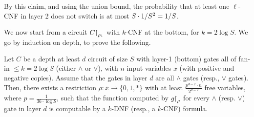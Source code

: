 By this claim, and using the union bound, the probability that at least one $\ell$-CNF in layer 2 does not switch is at most $ S\cdot 1/S^2 = 1/S$.



We now start from a circuit $C{\upharpoonright}_{\rho_1}$ with $k$-CNF at the bottom, for $k = 2 \log S$.
We go by induction on depth, to prove the following.


\begin{tcolorbox}[colframe=white, colback=red!11, boxrule=0mm, sharp corners]
\begin{lemma}\label{lem:induction-switch}
Let $C$ be a depth at least $d$ circuit of size $S$ 
with layer-1 (bottom) gates all of fan-in  $ \leq k=2 \log S$ (either  $\land$ or $\lor$),
with $n$ input variables  
$\overline x$ (with positive and negative copies). Assume that the gates in layer $d$ are all $\land$ gates (resp., $\lor$ gates). 
Then, there exists a restriction $\rho: \overline {x} \rightarrow\{0,1, *\} $ with at least  $\frac{p^{d-2} \cdot n}{2^{d-2}} $ free variables, where $ p=\frac{1}{36 \cdot \log S}$, such that  
the function computed by $g{\upharpoonright}_{\rho}$ for every $\land$ (resp. $\lor$) gate in layer $d$ is computable by a $k$-DNF (resp., a $k$-CNF) formula. 
\end{lemma} 
\end{tcolorbox}


